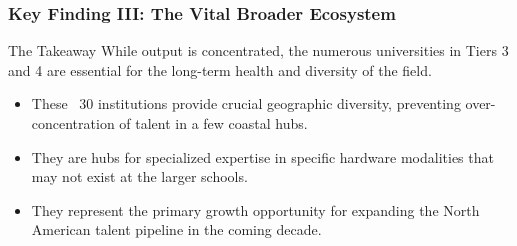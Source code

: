 \documentclass[aspectratio=169]{beamer}
\begin{document}
\begin{frame}
    \frametitle{Key Finding III: The Vital Broader Ecosystem}
    
    \begin{alertblock}{The Takeaway}
        While output is concentrated, the numerous universities in Tiers 3 and 4 are essential for the long-term health and diversity of the field.
    \end{alertblock}
    
    \begin{itemize}
        \item These ~30 institutions provide crucial geographic diversity, preventing over-concentration of talent in a few coastal hubs.
        \item They are hubs for specialized expertise in specific hardware modalities that may not exist at the larger schools.
        \item They represent the primary growth opportunity for expanding the North American talent pipeline in the coming decade.
    \end{itemize}
\end{frame}
\end{document}
